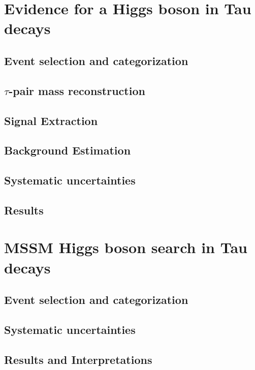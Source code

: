 \section{Evidence for a Higgs boson in Tau decays}

\subsection{Event selection and categorization}

\subsection{$\tau$-pair mass reconstruction}

\subsection{Signal Extraction}

\subsection{Background Estimation}

\subsection{Systematic uncertainties}

\subsection{Results}

\section{MSSM Higgs boson search in Tau decays}

\subsection{Event selection and categorization}

\subsection{Systematic uncertainties}

\subsection{Results and Interpretations}


